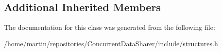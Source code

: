 \subsection*{Additional Inherited Members}


The documentation for this class was generated from the following file\+:\begin{DoxyCompactItemize}
\item 
/home/martin/repositories/\+Concurrent\+Data\+Sharer/include/structures.\+h\end{DoxyCompactItemize}
